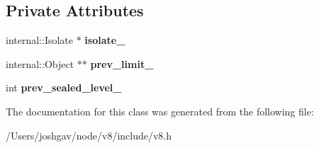 \subsection*{Private Attributes}
\begin{DoxyCompactItemize}
\item 
internal\+::\+Isolate $\ast$ {\bfseries isolate\+\_\+}\hypertarget{classv8_1_1_seal_handle_scope_a11eec9b548caf6a6e6b1ff124438da5f}{}\label{classv8_1_1_seal_handle_scope_a11eec9b548caf6a6e6b1ff124438da5f}

\item 
internal\+::\+Object $\ast$$\ast$ {\bfseries prev\+\_\+limit\+\_\+}\hypertarget{classv8_1_1_seal_handle_scope_a961f11f0c68251029b03a55a3724484a}{}\label{classv8_1_1_seal_handle_scope_a961f11f0c68251029b03a55a3724484a}

\item 
int {\bfseries prev\+\_\+sealed\+\_\+level\+\_\+}\hypertarget{classv8_1_1_seal_handle_scope_a070f75eb0735b4b0bf7b29d69e6b4e21}{}\label{classv8_1_1_seal_handle_scope_a070f75eb0735b4b0bf7b29d69e6b4e21}

\end{DoxyCompactItemize}


The documentation for this class was generated from the following file\+:\begin{DoxyCompactItemize}
\item 
/\+Users/joshgav/node/v8/include/v8.\+h\end{DoxyCompactItemize}
